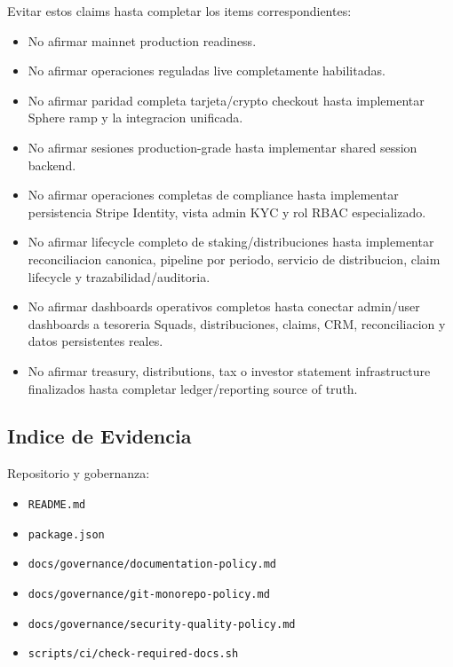 \documentclass[
  10pt,
  letterpaper,
]{article}
\providecommand{\tightlist}{%
  \setlength{\itemsep}{0pt}\setlength{\parskip}{0pt}}
\let\oldtexttt\texttt
\renewcommand{\texttt}[1]{\oldtexttt{\small #1}}
\begin{document}
Evitar estos claims hasta completar los items correspondientes:

\begin{itemize}
\tightlist
\item
  No afirmar mainnet production readiness.
\item
  No afirmar operaciones reguladas live completamente habilitadas.
\item
  No afirmar paridad completa tarjeta/crypto checkout hasta implementar
  Sphere ramp y la integracion unificada.
\item
  No afirmar sesiones production-grade hasta implementar shared session
  backend.
\item
  No afirmar operaciones completas de compliance hasta implementar
  persistencia Stripe Identity, vista admin KYC y rol RBAC
  especializado.
\item
  No afirmar lifecycle completo de staking/distribuciones hasta
  implementar reconciliacion canonica, pipeline por periodo, servicio de
  distribucion, claim lifecycle y trazabilidad/auditoria.
\item
  No afirmar dashboards operativos completos hasta conectar admin/user
  dashboards a tesoreria Squads, distribuciones, claims, CRM,
  reconciliacion y datos persistentes reales.
\item
  No afirmar treasury, distributions, tax o investor statement
  infrastructure finalizados hasta completar ledger/reporting source of
  truth.
\end{itemize}

\subsection{Indice de Evidencia}\label{indice-de-evidencia}

Repositorio y gobernanza:

\begin{itemize}
\tightlist
\item
  \texttt{README.md}
\item
  \texttt{package.json}
\item
  \texttt{docs/governance/documentation-policy.md}
\item
  \texttt{docs/governance/git-monorepo-policy.md}
\item
  \texttt{docs/governance/security-quality-policy.md}
\item
  \texttt{scripts/ci/check-required-docs.sh}
\end{itemize}
\end{document}
